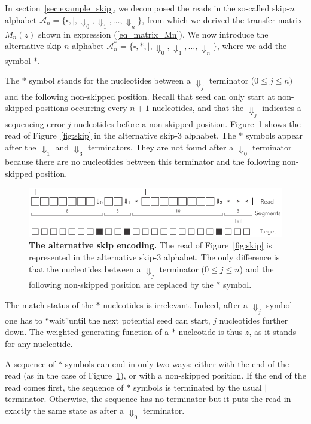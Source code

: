 \documentclass{article}
\begin{document}
In section~\ref{sec:example_skip}, we decomposed the reads in
the so-called skip-$n$ alphabet $\mathcal{A}_n = \{\square, |,
\Downarrow_0, \Downarrow_1, \ldots, \Downarrow_n \}$, from which we
derived the transfer matrix $M_n(z)$ shown in expression
(\ref{eq_matrix_Mn}). We now introduce the alternative skip-$n$ alphabet
$\mathcal{A}^*_n = \{\square, *, |, \Downarrow_0, \Downarrow_1, \ldots,
\Downarrow_n \}$, where we add the symbol $*$.

The $*$ symbol stands for the nucleotides between a $\Downarrow_j$
terminator ($0 \leq j \leq n)$ and the following non-skipped position.
Recall that seed can only start at non-skipped positions occurring every
$n+1$ nucleotides, and that the $\Downarrow_j$ indicates a sequencing
error $j$ nucleotides before a non-skipped position.
Figure~\ref{fig_alt_skip} shows the read of Figure~\ref{fig:skip} in the
alternative skip-3 alphabet. The $*$ symbols appear after the
$\Downarrow_1$ and $\Downarrow_3$ terminators. They are not found after a
$\Downarrow_0$ terminator because there are no nucleotides between this
terminator and the following non-skipped position.

\begin{figure}[h]
\centering
\includegraphics[scale=0.85]{alternative_sketch_skip.pdf}
\caption{\textbf{The alternative skip encoding.}
The read of Figure~\ref{fig:skip} is represented in the alternative skip-3
alphabet. The only difference is that the nucleotides between a
$\Downarrow_j$ terminator ($0 \leq j \leq n$) and the following
non-skipped position are replaced by the $*$ symbol.}
\label{fig_alt_skip}
\end{figure}

The match status of the $*$ nucleotides is irrelevant. Indeed, after a
$\Downarrow_j$ symbol one has to ``wait''until the next potential seed can
start, $j$ nucleotides further down. The weighted generating function of a
$*$ nucleotide is thus $z$, as it stands for any nucleotide.

A sequence of $*$ symbols can end in only two ways: either with the end of
the read (as in the case of Figure~\ref{fig_alt_skip}), or with a
non-skipped position. If the end of the read comes first, the sequence of
$*$ symbols is terminated by the usual $|$ terminator. Otherwise, the
sequence has no terminator but it puts the read in exactly the same state
as after a $\Downarrow_0$ terminator.
\end{document}
